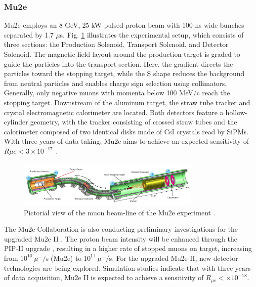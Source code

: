 \begin{refsection}
        \subsubsection{Mu2e}
        Mu2e employs an 8 GeV, 25 kW pulsed proton beam with 100 ns wide bunches separated by 1.7 $\mu$s. 
        Fig. \ref{Mu2e} illustrates the experimental setup, which consists of three sections: the Production Solenoid, Transport Solenoid, and Detector Solenoid. 
        The magnetic field layout around the production target is graded to guide the particles into the transport section. 
        Here, the gradient directs the particles toward the stopping target, while the S shape reduces the background from neutral particles and enables charge sign selection using collimators. 
        Generally, only negative muons with momenta below 100 MeV/c reach the stopping target. 
        Downstream of the aluminum target, the straw tube tracker and crystal electromagnetic calorimeter are located. Both detectors feature a hollow-cylinder geometry, with the tracker consisting of crossed straw tubes and the calorimeter composed of two identical disks made of CsI crystals read by SiPMs. 
        With three years of data taking, Mu2e aims to achieve an expected sensitivity of $R{\mu e}<3\times10^{-17}$ \cite{MTDR}.

        \begin{figure}[h!]
            \centering
            \includegraphics[width=0.8\textwidth]{Figures/Introduction/mu2e_apparatus.jpg}
            \caption[cLFV: Mu2e experiment]{Pictorial view of the muon beam-line of the Mu2e experiment \cite{MTDR}.}
        \label{Mu2e}
        \end{figure}
        
        \noindent
        The Mu2e Collaboration is also conducting preliminary investigations for the upgraded Mu2e II \cite{Mu2e_II:2018}. 
        The proton beam intensity will be enhanced through the PIP-II upgrade \cite{PIP_II:2018}, resulting in a higher rate of stopped muons on target, increasing from $10^{10}\ \mu^-/$s (Mu2e) to $10^{11}\ \mu^-/$s. For the upgraded Mu2e II, new detector technologies are being explored. 
        Simulation studies indicate that with three years of data acquisition, Mu2e II is expected to achieve a sensitivity of $R_{\mu e} < \times10^{-18}$.


\end{refsection}

